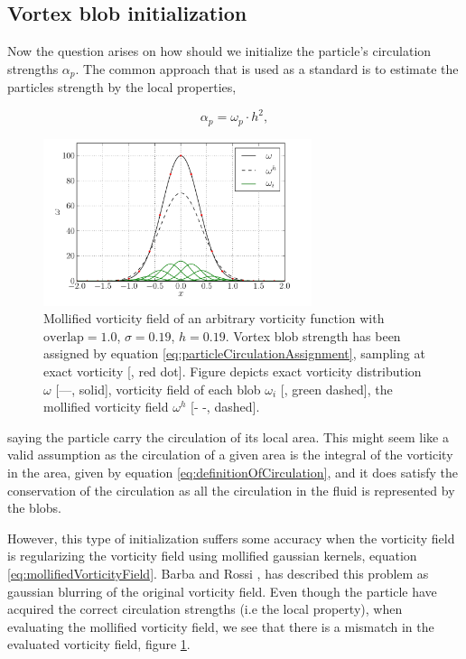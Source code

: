 \subsection{Vortex blob initialization}
\label{subsec:vortexBlobInitialization}
Now the question arises on how should we initialize the particle's circulation strengths $\alpha_p$. The common approach that is used as a standard is to estimate the particles strength by the local properties,

	\begin{equation}
	\alpha_p = \omega_p\cdot h^2,
	\label{eq:particleCirculationAssignment}
	\end{equation}

	\begin{figure}[t]
	\centering
	\includegraphics[width=0.7\textwidth]{figures/lagrangian/particleInitialization.pdf}
	\caption{Mollified vorticity field of an arbitrary vorticity function with $\mathrm{overlap}=1.0$, $\sigma=0.19$, $h=0.19$. Vortex blob strength has been assigned by equation \ref{eq:particleCirculationAssignment}, sampling at exact vorticity [{\color{plotRed}{$\bullet$}}, red dot]. Figure depicts exact vorticity distribution $\omega$ [---, solid], vorticity field of each blob $\omega_i$ [{\color{darkgreen}{---}}, green dashed], the mollified vorticity field $\omega^h$ [- -, dashed].  }
	\label{fig:particleInitialization}
	\end{figure}

saying the particle carry the circulation of its local area. This might seem like a valid assumption as the circulation of a given area is the integral of the vorticity in the area, given by equation \ref{eq:definitionOfCirculation}, and it does satisfy the conservation of the circulation as all the circulation in the fluid is represented by the blobs.

However, this type of initialization suffers some accuracy when the vorticity field is regularizing the vorticity field using mollified gaussian kernels, equation \ref{eq:mollifiedVorticityField}. Barba and Rossi \cite{Barba2010}, has described this problem as gaussian blurring of the original vorticity field. Even though the particle have acquired the correct circulation strengths (i.e the local property), when evaluating the mollified vorticity field, we see that there is a mismatch in the evaluated vorticity field, figure \ref{fig:particleInitialization}. 

